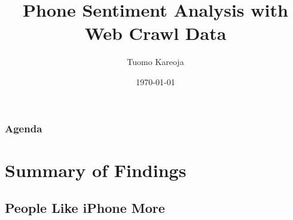 \documentclass[10pt]{beamer}
\title[What Phone do People Like?]{Phone Sentiment Analysis with Web Crawl Data} %
\author{Tuomo Kareoja} %
\institute[Alert! Analytics] %
{
Alert! Analytics \\ %
\medskip
}
\date{\today} %
\begin{document}
\begin{frame}
\titlepage %
\end{frame}

\begin{frame}
\frametitle{Agenda} %
\tableofcontents %
\end{frame}


\section{Summary of Findings}


\subsection{People Like iPhone More}
\end{document}
